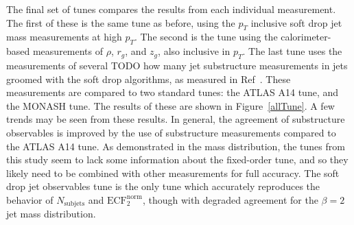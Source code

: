 The final set of tunes compares the results from each individual measurement. The first of these is the same tune as before, using the $p_T$ inclusive soft drop jet mass measurements at high $p_T$.
The second is the tune using the calorimeter-based measurements of $\rho$, $r_g$, and $z_g$, also inclusive in $p_T$. 
The last tune uses the measurements of several TODO how many jet substructure measurements in jets groomed with the soft drop algorithms, as measured in Ref~\cite{jssObservables}.
These measurements are compared to two standard tunes: the ATLAS A14 tune, and the MONASH tune.
The results of these are shown in Figure~\ref{allTune}. 
A few trends may be seen from these results. In general, the agreement of substructure observables is improved by the use of substructure measurements compared to the ATLAS A14 tune.
As demonstrated in the mass distribution, the tunes from this study seem to lack some information about the fixed-order tune, 
and so they likely need to be combined with other measurements for full accuracy. 
The soft drop jet observables tune is the only tune which accurately reproduces the behavior of $N_{\mathrm{subjets}}$ and $\mathrm{ECF}_2^{\mathrm{norm}}$, though with
degraded agreement for the $\beta=2$ jet mass distribution.


